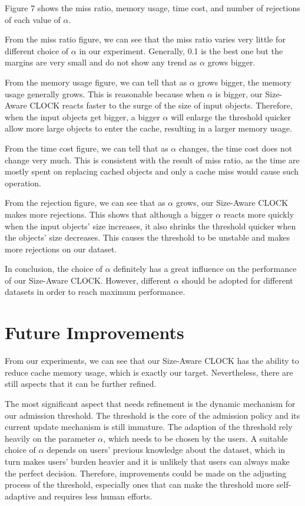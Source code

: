 \documentclass[journal,10.5pt,onecolumn]{IEEEtran}
\begin{document}
Figure 7 shows the miss ratio, memory usage, time cost, and number of rejections of each value of $\alpha$.

From the miss ratio figure, we can see that the miss ratio varies very little for different choice of $\alpha$ in our experiment. Generally, 0.1 is the best one but the margins are very small and do not show any trend as $\alpha$ grows bigger.

From the memory usage figure, we can tell that as $\alpha$ grows bigger, the memory usage generally grows. This is reasonable because when $\alpha$ is bigger, our Size-Aware CLOCK reacts faster to the surge of the size of input objects. Therefore, when the input objects get bigger, a bigger $\alpha$ will enlarge the threshold quicker allow more large objects to enter the cache, resulting in a larger memory usage.

From the time cost figure, we can tell that as $\alpha$ changes, the time cost does not change very much. This is consistent with the result of miss ratio, as the time are mostly spent on replacing cached objects and only a cache miss would cause such operation.

From the rejection figure, we can see that as $\alpha$ grows, our Size-Aware CLOCK makes more rejections. This shows that although a bigger $\alpha$ reacts more quickly when the input objects' size increases, it also shrinks the threshold quicker when the objects' size decreases. This causes the threshold to be unstable and makes more rejections on our dataset.

In conclusion, the choice of $\alpha$ definitely has a great influence on the performance of our Size-Aware CLOCK. However, different $\alpha$ should be adopted for different datasets in order to reach maximum performance.


\section{Future Improvements}
From our experiments, we can see that our Size-Aware CLOCK has the ability to reduce cache memory usage, which is exactly our target. Nevertheless, there are still aspects that it can be further refined. 

The most significant aspect that needs refinement is the dynamic mechanism for our admission threshold. The threshold is the core of the admission policy and its current update mechanism is still immature. The adaption of the threshold rely heavily on the parameter $\alpha$, which needs to be chosen by the users. A suitable choice of $\alpha$ depends on users' previous knowledge about the dataset, which in turn makes users' burden heavier and it is unlikely that users can always make the perfect decision. Therefore, improvements could be made on the adjusting process of the threshold, especially ones that can make the threshold more self-adaptive and requires less human efforts.
\end{document}
